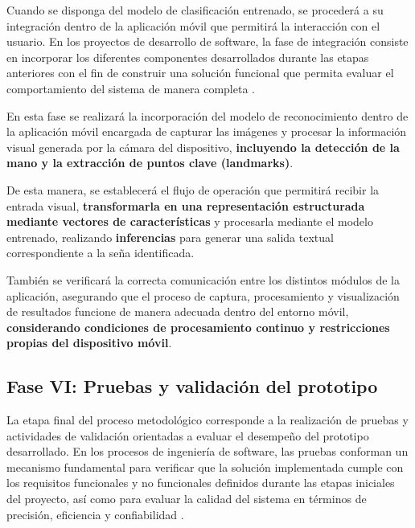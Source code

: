 	Cuando se disponga del modelo de clasificación entrenado, se procederá a su
	integración dentro de la aplicación móvil que permitirá la interacción con el
	usuario. En los proyectos de desarrollo de software, la fase de integración
	consiste en incorporar los diferentes componentes desarrollados durante las
	etapas anteriores con el fin de construir una solución funcional que permita
	evaluar el comportamiento del sistema de manera completa
	\cite{pressman2014,sommerville2016}.
	
	En esta fase se realizará la incorporación del modelo de reconocimiento
	dentro de la aplicación móvil encargada de capturar las imágenes y procesar la
	información visual generada por la cámara del dispositivo, \textbf{incluyendo la detección de la mano y la extracción de puntos clave (landmarks)}.
	
	De esta manera, se establecerá el flujo de operación que permitirá recibir la entrada visual,
	\textbf{transformarla en una representación estructurada mediante vectores de características} y procesarla mediante el modelo entrenado, realizando \textbf{inferencias} para generar una salida textual
	correspondiente a la seña identificada.
	
	También se verificará la correcta comunicación entre los distintos módulos
	de la aplicación, asegurando que el proceso de captura, procesamiento y
	visualización de resultados funcione de manera adecuada dentro del entorno
	móvil, \textbf{considerando condiciones de procesamiento continuo y restricciones propias del dispositivo móvil}.
	
	\subsection{Fase VI: Pruebas y validación del prototipo}
	
	La etapa final del proceso metodológico corresponde a la realización de
	pruebas y actividades de validación orientadas a evaluar el desempeño del
	prototipo desarrollado. En los procesos de ingeniería de software, las pruebas
	conforman un mecanismo fundamental para verificar que la solución implementada
	cumple con los requisitos funcionales y no funcionales definidos durante las
	etapas iniciales del proyecto, así como para evaluar la calidad del sistema en
	términos de precisión, eficiencia y confiabilidad \cite{pressman2014,mall2018}.
	
